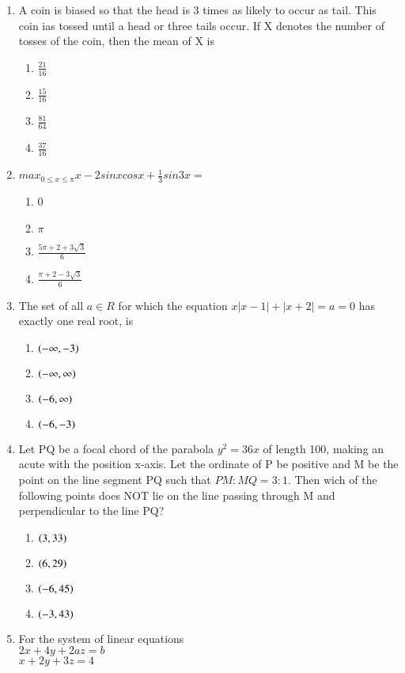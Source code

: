 \documentclass[journal,12pt,onecolumn]{IEEEtran}
\theoremstyle{remark}
\begin{document}
\begin{enumerate}
\item A coin is biased so that the head is 3 times as likely to occur as tail. This coin ias tossed until a head or three tails occur. If X denotes the number of tosses of the coin, then the mean of X is 
\begin{enumerate}
    \item $\frac{21}{16}$
    \item $\frac{15}{16}$
    \item $\frac{81}{64}$
    \item $\frac{37}{16}$
\end{enumerate}
\item $max_{0 \leq x\leq \pi}{x-2sinxcosx+ \frac{1}{3}sin3x}=$
\begin{enumerate}
    \item 0
    \item $\pi$
    \item $\frac{5\pi+2+3\sqrt{3}}{6}$
    \item $\frac{\pi+2-3\sqrt{3}}{6}$
\end{enumerate}
\item The set of all $a \in R$ for which the equation $x|x-1| + |x+2| = a =0$ has exactly one real root, is
\begin{enumerate}
    \item $\left(-\infty,-3\right)$
    \item $\left(-\infty,\infty\right)$
    \item $\left(-6,\infty\right)$
    \item $\left(-6,-3\right)$
\end{enumerate}
\item Let PQ be a focal chord of the parabola $y^2 = 36x$ of length 100, making an acute with the position x-axis. Let the ordinate of P be positive and M be the point on the line segment PQ such that $PM:MQ=3:1$. Then wich of the following points does NOT lie on the line passing through M and perpendicular to the line PQ? 
\begin{enumerate}
    \item $\left(3,33\right)$
    \item $\left(6,29\right)$
    \item $\left(-6,45\right)$
    \item $\left(-3,43\right)$
\end{enumerate}
\item For the system of linear equations\\
$2x + 4y + 2az = b$\\
$x +  2y + 3z = 4$\\

\end{enumerate}
\end{document}
